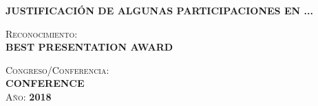 
\cleardoublepage
\vspace*{10cm}
\uppercase{\textbf{JUSTIFICACIÓN DE ALGUNAS PARTICIPACIONES EN ...}}
\cleardoublepage



\cleardoublepage
\vspace*{10cm}
\textsc{Reconocimiento}:\\[5pt]
\uppercase{\textbf{BEST PRESENTATION AWARD}}\\

\bigskip

\textsc{Congreso/Conferencia}:\\[5pt]
\uppercase{\textbf{CONFERENCE}}\\

\textsc{Año}: \uppercase{\textbf{2018}}\\
\cleardoublepage







